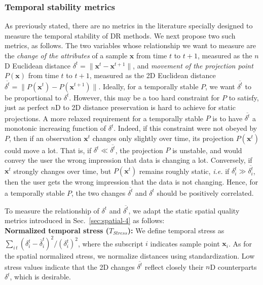 \subsubsection{Temporal stability metrics}
%
As previously stated, there are no metrics in the literature specially designed to measure the temporal stability of DR methods. We next propose two such metrics, as follows. The two variables whose relationship we want to measure are the \emph{change of the attributes} of a sample $\mathbf{x}$ from time $t$ to $t+1$, measured as the $n$D Euclidean distance
$ \delta^t = \|\mathbf{x}^t - \mathbf{x}^{t+1}\|$, and \emph{movement of the projection point $P(\mathbf{x})$} from time $t$ to $t+1$, measured as the 2D Euclidean distance
$ \overline{\delta^t} = \|P(\mathbf{x}^t) - P(\mathbf{x}^{t+1})\|$. Ideally, for a temporally stable $P$, we want $\overline{\delta^t}$ to be proportional to $\delta^t$. However, this may be a too hard constraint for $P$ to satisfy, just as perfect $n$D to 2D distance preservation is hard to achieve for static projections. A more relaxed requirement for a temporally stable $P$ is to have
 $\overline{\delta^t}$ a monotonic increasing function of $\delta^t$. Indeed, if this constraint were not obeyed by $P$, then if an observation $\mathbf{x}^t$ changes only slightly over time, its projection  $P(\mathbf{x}^t)$ could move a lot. That is, if  $\delta^t \ll \overline{\delta^t}$, the projection $P$ is unstable, and would convey the user the wrong impression that data is changing a lot. Conversely, if $\mathbf{x}^t$ strongly changes over time, but $P(\mathbf{x}^t)$ remains roughly static, \emph{i.e.} if $\delta_i^t \gg \overline{\delta_i^t}$, then the user gets the wrong impression that the data is not changing. Hence, for a temporally stable $P$, the two changes $\overline{\delta^t}$ and ${\delta^t}$ should be positively correlated.

To measure the relationship of ${\delta^t}$ and $\overline{\delta^t}$, we adapt the static spatial quality metrics introduced in Sec.~\ref{sec:spatial-4} as follows:\\

\noindent
\textbf{Normalized temporal stress ($T_{Stress}$):} We define temporal stress as $\sum_{i\, t}{(\delta_{i}^{t}-\overline{\delta}_{i}^{t})^{2}} / { (\delta_{i}^t)^{2}}$, where the subscript $i$ indicates sample point $\mathbf{x}_i$. As for the spatial normalized stress, we normalize distances using standardization. Low stress values indicate that the 2D changes $\overline{\delta^t}$ reflect closely their $n$D counterparts ${\delta^t}$, which is desirable.\\

